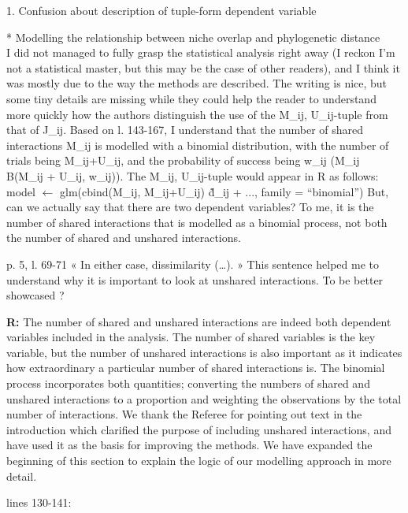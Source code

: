\documentclass[12pt]{letter}
\newenvironment{refquote}{\bigskip \begin{it}}{\end{it}\smallskip}
\begin{document}
	1. Confusion about description of tuple-form dependent variable

		\begin{refquote}
			* Modelling the relationship between niche overlap and phylogenetic distance\\
			I did not managed to fully grasp the statistical analysis right away (I reckon I'm not a statistical master, but this may be the case of other readers), and I think it was mostly due to the way the methods are described. The writing is nice, but some tiny details are missing while they could help the reader to understand more quickly how the authors distinguish the use of the {M\_ij, U\_ij}-tuple from that of J\_ij.
			Based on l. 143-167, I understand that the number of shared interactions M\_ij is modelled with a binomial distribution, with the number of trials being M\_ij+U\_ij, and the probability of success being w\_ij (M\_ij ~ B(M\_ij + U\_ij, w\_ij)). The {M\_ij, U\_ij}-tuple would appear in R as follows:
			model $\leftarrow$ glm(cbind(M\_ij, M\_ij+U\_ij) \~ d\_ij + ..., family = “binomial”)
			But, can we actually say that there are two dependent variables? To me, it is the number of shared interactions that is modelled as a binomial process, not both the number of shared and unshared interactions.

			\smallskip

			p. 5, l. 69-71 « In either case, dissimilarity (…). » This sentence helped me to understand why it is important to look at unshared interactions. To be better showcased ?

		\end{refquote}


		\textbf{R:} The number of shared and unshared interactions are indeed both dependent variables included in the analysis. The number of shared variables is the key variable, but the number of unshared interactions is also important as it indicates how extraordinary a particular number of shared interactions is. The binomial process incorporates both quantities; converting the numbers of shared and unshared interactions to a proportion and weighting the observations by the total number of interactions. We thank the Referee for pointing out text in the introduction which clarified the purpose of including unshared interactions, and have used it as the basis for improving the methods. We have expanded the beginning of this section to explain the logic of our modelling approach in more detail.


		lines 130-141:
\end{document}
